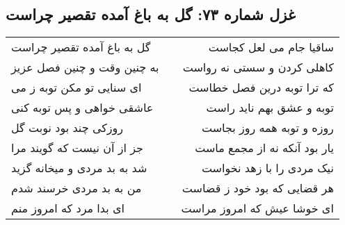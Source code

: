 \begin{center}
\section*{غزل شماره ۷۳: گل به باغ آمده تقصیر چراست}
\label{sec:073}
\begin{longtable}{l p{0.5cm} r}
گل به باغ آمده تقصیر چراست
&&
ساقیا جام می لعل کجاست
\\
به چنین وقت و چنین فصل عزیز
&&
کاهلی کردن و سستی نه رواست
\\
ای سنایی تو مکن توبه ز می
&&
که ترا توبه درین فصل خطاست
\\
عاشقی خواهی و پس توبه کنی
&&
توبه و عشق بهم ناید راست
\\
روزکی چند بود نوبت گل
&&
روزه و توبه همه روز بجاست
\\
جز از آن نیست که گویند مرا
&&
یار بود آنکه نه از مجمع ماست
\\
شد به بد مردی و میخانه گزید
&&
نیک مردی را با زهد نخواست
\\
من به بد مردی خرسند شدم
&&
هر قضایی که بود خود ز قضاست
\\
ای بدا مرد که امروز منم
&&
ای خوشا عیش که امروز مراست
\\
\end{longtable}
\end{center}
